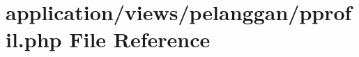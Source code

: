 \hypertarget{pprofil_8php}{}\section{application/views/pelanggan/pprofil.php File Reference}
\label{pprofil_8php}
